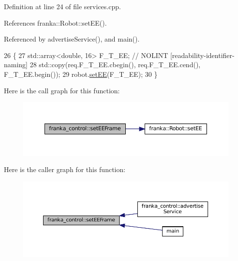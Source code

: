 Definition at line 24 of file services.\+cpp.



References franka\+::\+Robot\+::set\+E\+E().



Referenced by advertise\+Service(), and main().


\begin{DoxyCode}
26                                        \{
27   std::array<double, 16> F\_T\_EE;  \textcolor{comment}{// NOLINT [readability-identifier-naming]}
28   std::copy(req.F\_T\_EE.cbegin(), req.F\_T\_EE.cend(), F\_T\_EE.begin());
29   robot.\hyperlink{classfranka_1_1Robot_a5043fca4c35f63b492d9e67c74ddc73b}{setEE}(F\_T\_EE);
30 \}
\end{DoxyCode}
Here is the call graph for this function\+:
\nopagebreak
\begin{figure}[H]
\begin{center}
\leavevmode
\includegraphics[width=350pt]{namespacefranka__control_aaab1e3e96b01a8589336c39998422dad_cgraph}
\end{center}
\end{figure}
Here is the caller graph for this function\+:
\nopagebreak
\begin{figure}[H]
\begin{center}
\leavevmode
\includegraphics[width=350pt]{namespacefranka__control_aaab1e3e96b01a8589336c39998422dad_icgraph}
\end{center}
\end{figure}
\mbox{\label{namespacefranka__control_a7ea982d94110cc6f522d42a140d608af}} 
